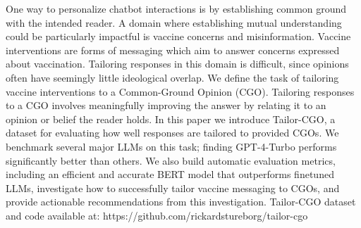 One way to personalize chatbot interactions is by establishing common ground with the intended reader. A domain where establishing mutual understanding could be particularly impactful is vaccine concerns and misinformation. Vaccine interventions are forms of messaging which aim to answer concerns expressed about vaccination. Tailoring responses in this domain is difficult, since opinions often have seemingly little ideological overlap. We define the task of tailoring vaccine interventions to a Common-Ground Opinion (CGO). Tailoring responses to a CGO involves meaningfully improving the answer by relating it to an opinion or belief the reader holds. In this paper we introduce Tailor-CGO, a dataset for evaluating how well responses are tailored to provided CGOs. We benchmark several major LLMs on this task; finding GPT-4-Turbo performs significantly better than others. We also build automatic evaluation metrics, including an efficient and accurate BERT model that outperforms finetuned LLMs, investigate how to successfully tailor vaccine messaging to CGOs, and provide actionable recommendations from this investigation. Tailor-CGO dataset and code available at: https://github.com/rickardstureborg/tailor-cgo